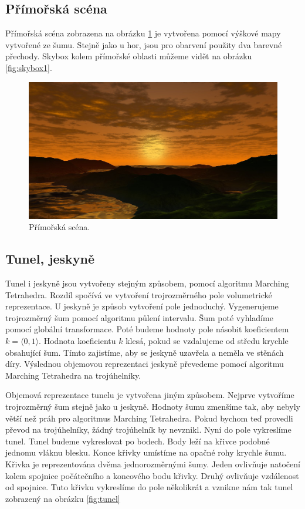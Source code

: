 \subsection{Přímořská scéna}
Přímořská scéna zobrazena na obrázku \ref{fig:pobrezi} je vytvořena pomocí výškové mapy vytvořené ze šumu.
Stejně jako u hor, jsou pro obarvení použity dva barevné přechody.
Skybox kolem přímořské oblasti můžeme vidět na obrázku \ref{fig:skybox1}.
\begin{figure}[h]
\centering
\includegraphics[width=15cm,keepaspectratio]{obr/pobrezi.jpg}
\caption{Přímořská scéna.}
\label{fig:pobrezi}
\end{figure}

\subsection{Tunel, jeskyně}
Tunel i jeskyně jsou vytvořeny stejným způsobem, pomocí algoritmu Marching Tetrahedra.
Rozdíl spočívá ve vytvoření trojrozměrného pole volumetrické reprezentace.
U jeskyně je způsob vytvoření pole jednoduchý.
Vygenerujeme trojrozměrný šum pomocí algoritmu půlení intervalu.
Šum poté vyhladíme pomocí globální transformace.
Poté budeme hodnoty pole násobit koeficientem $k=\langle 0,1 \rangle$.
Hodnota koeficientu $k$ klesá, pokud se vzdalujeme od středu krychle obsahující šum.
Tímto zajistíme, aby se jeskyně uzavřela a neměla ve stěnách díry.
Výslednou objemovou reprezentaci jeskyně převedeme pomocí algoritmu Marching Tetrahedra na trojúhelníky.

Objemová reprezentace tunelu je vytvořena jiným způsobem.
Nejprve vytvoříme troj\-roz\-měr\-ný šum stejně jako u jeskyně.
Hodnoty šumu zmenšíme tak, aby nebyly větší než práh pro algoritmus Marching Tetrahedra.
Pokud bychom teď provedli převod na trojúhelníky, žádný trojúhelník by nevznikl.
Nyní do pole vykreslíme tunel.
Tunel budeme vykreslovat po bodech.
Body leží na křivce podobné jednomu vláknu blesku.
Konce křivky umístíme na opačné rohy krychle šumu.
Křivka je reprezentována dvěma jednorozměrnými šumy.
Jeden ovlivňuje natočení kolem spojnice počátečního a koncového bodu křivky.
Druhý ovlivňuje vzdálenost od spojnice.
Tuto křivku vykreslíme do pole několikrát a vznikne nám tak tunel zobrazený na obrázku \ref{fig:tunel}

